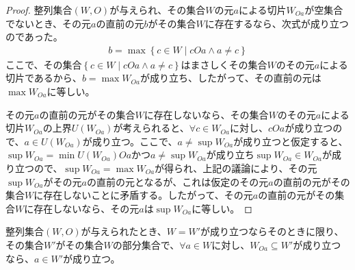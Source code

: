 \documentclass[dvipdfmx]{jsarticle}
\begin{document}
\begin{proof}
整列集合$(W,O)$が与えられ、その集合$W$の元$a$による切片$W_{Oa}$が空集合でないとき、その元$a$の直前の元$b$がその集合$W$に存在するなら、次式が成り立つのであった。
\begin{align*}
b = \max\left\{ c \in W \middle| cOa \land a \neq c \right\}
\end{align*}
ここで、その集合$\left\{ c \in W \middle| cOa \land a \neq c \right\}$はまさしくその集合$W$のその元$a$による切片であるから、$b = \max W_{Oa}$が成り立ち、したがって、その直前の元は$\max W_{Oa}$に等しい。\par
その元$a$の直前の元がその集合$W$に存在しないなら、その集合$W$のその元$a$による切片$W_{Oa}$の上界$U\left( W_{Oa} \right)$が考えられると、$\forall c \in W_{Oa}$に対し、$cOa$が成り立つので、$a \in U\left( W_{Oa} \right)$が成り立つ。ここで、$a \neq \sup W_{Oa}$が成り立つと仮定すると、$\sup W_{Oa} = \min{U\left( W_{Oa} \right)}Oa$かつ$a \neq \sup W_{Oa}$が成り立ち$\sup W_{Oa} \in W_{Oa}$が成り立つので、$\sup W_{Oa} = \max W_{Oa}$が得られ、上記の議論により、その元$\sup W_{Oa}$がその元$a$の直前の元となるが、これは仮定のその元$a$の直前の元がその集合$W$に存在しないことに矛盾する。したがって、その元$a$の直前の元がその集合$W$に存在しないなら、その元$a$は$\sup W_{Oa}$に等しい。
\end{proof}
\begin{thm}\label{1.3.2.8}
整列集合$(W,O)$が与えられたとき、$W = W'$が成り立つならそのときに限り、その集合$W'$がその集合$W$の部分集合で、$\forall a \in W$に対し、$W_{Oa} \subseteq W'$が成り立つなら、$a \in W'$が成り立つ。
\end{thm}
\end{document}
